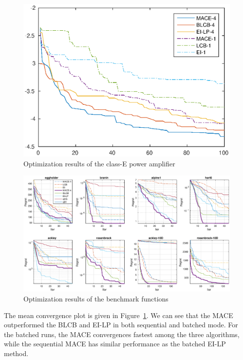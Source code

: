 \begin{figure}[htbp]
\vskip 0.2in
\begin{center}
\centerline{\includegraphics[width=\columnwidth]{./img/ClassE_mean.eps}}
\caption{Optimization results of the class-E power amplifier}
\label{fig:resClassE}
\end{center}
\vskip -0.2in
\end{figure}

\begin{figure}[]
    \begin{center}
        \centerline{\includegraphics[width=1.0\linewidth]{./img/convplot.eps}}
        \caption{Optimization results of the benchmark functions}
        \label{fig:CovPlotBenchmark}
    \end{center}
\end{figure}

The mean convergence plot is given in Figure~\ref{fig:resClassE}. We can see
that the MACE outperformed the BLCB and EI-LP in both sequential and batched
mode. For the batched runs, the MACE convergences fastest among the three
algorithms, while the sequential MACE has similar performance as the batched
EI-LP method.
